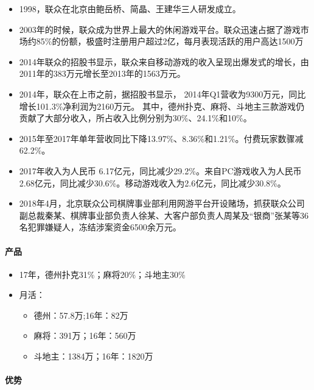 \documentclass[11pt]{article}
\providecommand{\tightlist}{%
      \setlength{\itemsep}{0pt}\setlength{\parskip}{0pt}}
\begin{document}
\begin{itemize}
\tightlist
\item
  1998，联众在北京由鲍岳桥、简晶、王建华三人研发成立。
\item
  2003年的时候，联众成为世界上最大的休闲游戏平台。联众迅速占据了游戏市场约85\%的份额，极盛时注册用户超过2亿，每月表现活跃的用户高达1500万
\item
  2014年联众的招股书显示，联众来自移动游戏的收入呈现出爆发式的增长，由2011年的383万元增长至2013年的1563万元。
\item
  2014年，联众在上市之前，据招股书显示，
  2014年Q1营收为9300万元，同比增长101.3\%净利润为2160万元。
  其中，德州扑克、麻将、斗地主三款游戏仍贡献了大部分收入，所占收入比例分别为30\%、24.1\%和10\%。
\item
  2015年至2017年单年营收同比下降13.97\%、8.36\%和1.21\%。付费玩家数骤减62.2\%。
\item
  2017年收入为人民币
  6.17亿元，同比减少29.2\%。来自PC游戏收入为人民币2.68亿元，同比减少30.6\%。移动游戏收入为2.6亿元，同比减少30.8\%。
\item
  2018年4月，北京联众公司棋牌事业部利用网游平台开设赌场，抓获联众公司副总裁秦某、棋牌事业部负责人徐某、大客户部负责人周某及``银商''张某等36名犯罪嫌疑人，冻结涉案资金6500余万元。
\end{itemize}

\hypertarget{ux4ea7ux54c1}{%
\paragraph{产品}\label{ux4ea7ux54c1}}

\begin{itemize}
\tightlist
\item
  17年，德州扑克31\%；麻将20\%；斗地主30\%
\item
  月活：

  \begin{itemize}
  \tightlist
  \item
    德州：57.8万;16年：82万
  \item
    麻将：391万；16年：560万
  \item
    斗地主：1384万；16年：1820万
  \end{itemize}
\end{itemize}

\hypertarget{ux4f18ux52bf}{%
\paragraph{优势}\label{ux4f18ux52bf}}
\end{document}
